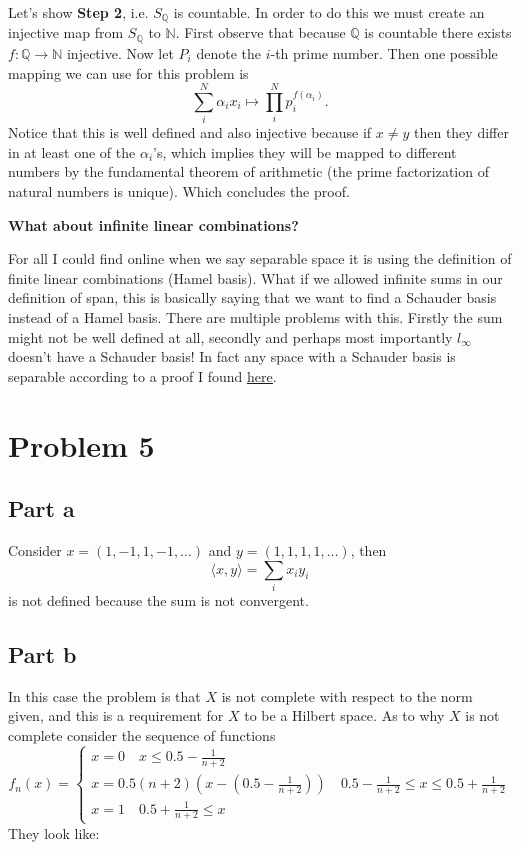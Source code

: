\documentclass[12pt]{article}%
\begin{document}
Let's show \textbf{Step 2}, i.e. $S_\mathbb{Q}$ is countable. In order to do this we must
create an injective map from $S_\mathbb{Q}$ to $\mathbb{N}$. First observe
that because $\mathbb{Q}$ is countable there exists $f:\mathbb{Q}\to\mathbb{N}$
injective. Now let $P_i$ denote the $i$-th prime number. Then one possible
mapping we can use for this problem is
\[
	\sum_i^N \alpha_ix_i \mapsto \prod_i^N p_i^{f(\alpha_i)}.
\]
Notice that this is well defined and also injective because if $x\neq y$ then
they differ in at least one of the $\alpha_i$'s, which implies they will be
mapped to different numbers by the fundamental theorem of arithmetic (the prime
factorization of natural numbers is unique). Which concludes the proof. \qedsymbol

\textbf{What about infinite linear combinations?}

For all I could find online when we say separable space it is using the
definition of finite linear combinations (Hamel basis).
What if we allowed infinite sums in our definition of span, this is basically
saying that we want to find a Schauder basis instead of a Hamel basis. There
are multiple problems with this. Firstly the sum might not be well defined at
all, secondly and perhaps most importantly $l_\infty$ doesn't have a Schauder
basis! In fact any space with a Schauder basis is separable according to a
proof I found \underline{\href{https://math.stackexchange.com/questions/297851/how-to-prove-that-if-a-normed-space-has-schauder-basis-then-it-is-separable-wh}{here}}.
\section*{Problem 5}
\subsection*{Part a}
Consider $x=(1,-1,1,-1,\dots)$ and $y=(1,1,1,1,\dots)$, then
\[
	\langle x,y \rangle=\sum_ix_iy_i
\]
is not defined because the sum is not convergent.
\subsection*{Part b}
In this case the problem is that $X$ is not complete with respect
to the norm given, and this is a requirement for $X$ to be a
Hilbert space. As to why $X$ is not complete consider the sequence
of functions
\[
	f_n(x)=\begin{cases}
		x=0 \quad x\leq0.5-\frac{1}{n+2}\\
		x=0.5(n+2)(x-(0.5-\frac{1}{n+2})) \quad 0.5-\frac{1}{n+2}\leq x \leq 0.5 +\frac{1}{n+2}\\
		x=1 \quad 0.5 +\frac{1}{n+2} \leq x
		\end{cases}
\]
They look like:
\end{document}
